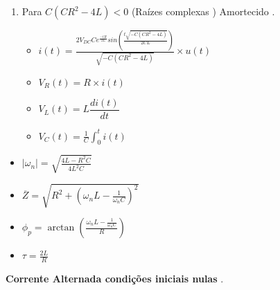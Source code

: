 \begin{enumerate}
\begin{itemize}
\begin{minipage}{0.95\linewidth}
\end{minipage}\par
%
\end{itemize}
\item
Para \quad $C(C R^2-4 L)<0$ \quad (Ra\'{i}zes  complexas ) \quad Amortecido .\par
%
\begin{itemize}
\item
$i(t)=\frac{2 V_{DC} C e^{\frac{-tR}{2L}} sin \left( \frac{t \sqrt{-C(CR^2-4L)}}{2CL} \right)}{\sqrt{-C(CR^2-4L)}}\times u(t)$\par
\item
$V_R(t)=R\times i(t)$\par
\item
$V_L(t)=L\dfrac{di(t)}{dt}$\par
%
\begin{minipage}{0.95\linewidth}
\end{minipage}\par
%
\item
$V_C(t)=\frac{1}{C}\int_0^ti(t)$\par
%
\begin{minipage}{0.95\linewidth}
\end{minipage}\par
%
\end{itemize}
\end{enumerate}
%
\begin{itemize}
\item
$| \omega_n |=\sqrt{\frac{4 L-R^2 C}{4 L^2 C}}$\par
\item
$\overline{Z}=\sqrt{R^2 + (\omega_n L -\frac{1}{\omega_n C})^2}$\par
\item
$\phi_p=\arctan\left(\frac{\omega_n L - \frac{1}{\omega_n C}}{R}\right)$\par
\item
$\tau=\frac{2 L}{R}$\par
\end{itemize}
\begin{flushleft}
{\bf Corrente  Alternada condi\c{c}\~{o}es  iniciais  nulas }.
\end{flushleft}
